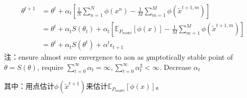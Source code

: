{\begin{algorithm}[h]
\begin{algorithmic}[1]
\begin{align*}
                        \theta^{t+1} & =\theta^t + \alpha_t \left[ \frac{1}{N}\sum_{n=1}^N\phi(x^n) - \frac{1}{M}\sum_{m=1}^M\phi(\tilde{x}^{t+1,m})  \right]\\
                        & =\theta^t + \alpha_t S(\theta_t) + \alpha_t \left[\mathbb{E}_{P_{model}}[\phi(x)] - \frac{1}{M}\sum_{m=1}^M\phi(\tilde{ x}^{t+1,m})\right]\\
                        & =\theta^t + \alpha_t S(\theta^t)+\alpha^t\epsilon_{t+1}
                        \end{align*}
                        注：ensure almost sure envergence to aon as $y$mptotically stable point of $\dot{\theta} = S(\theta)$, require $\sum_{t=0}^\infty \alpha_t = \infty,\sum_{t=0}^\infty \alpha_t^2 < \infty$.
                        \State Decrease $\alpha_t$
                    \EndFor
                \end{algorithmic}
            \end{algorithm}
            其中：用点估计$\phi(\tilde{x}^{t+1})$来估计$\mathbb{E}_{P_{model}}[\phi(x)]$。

}
